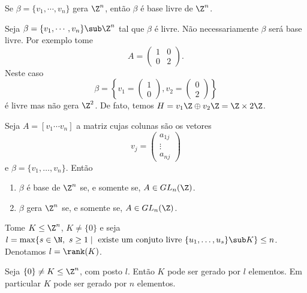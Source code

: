 \begin{lema}
	Se $\beta = \{v_1,\cdots, v_n\}$ gera $\Z^n$, ent\~ao $\beta$ \'e base livre de $\Z^n$.
\end{lema}

\begin{observacao}
	Seja $\beta = \{v_1, \cdots, v_n\} \sub \Z^n$ tal que $\beta$ \'e livre. N\~ao necessariamente $\beta$ ser\'a base livre. Por exemplo tome
	\[
		A = \begin{pmatrix}
			1 & 0\\
			0 & 2
		\end{pmatrix}.
	\]
	Neste caso
	\[
		\beta = \left\{v_1 = \begin{pmatrix}
			1\\0
		\end{pmatrix}, v_2 = \begin{pmatrix}
			0\\2
		\end{pmatrix}\right\}
	\]
	\'e livre mas n\~ao gera $\Z^2$. De fato, temos $H = v_1\Z \oplus v_2\Z = \Z \times 2\Z$.
\end{observacao}

\begin{lema}
	Seja $A = [v_1 \cdots v_n]$ a matriz cujas colunas s\~ao os vetores
	\[
		v_j = \begin{pmatrix}
			a_{1j}\\
			\vdots\\
			a_{nj}
		\end{pmatrix}
	\]
	e $\beta = \{v_1, \dots, v_n\}$. Ent\~ao
	\begin{enumerate}
		\item $\beta$ \'e base de $\Z^n$ se, e somente se, $A \in GL_n(\Z)$.
		\item $\beta$ gera $\Z^n$ se, e somente se, $A \in GL_n(\Z)$.
	\end{enumerate}
\end{lema}

Tome $K \le \Z^n$, $K \ne \{0\}$ e seja $l = \max\{s \in \N,\ s \ge 1 \mid \mbox{ existe um conjuto livre } \{u_1, \dots, u_s\} \sub K\} \le n$. Denotamos $l = \rank(K)$.

\begin{lema}
	Seja $\{0\} \ne K \le \Z^n$, com posto $l$. Ent\~ao $K$ pode ser gerado por $l$ elementos. Em particular $K$ pode ser gerado por $n$ elementos.
\end{lema}




















